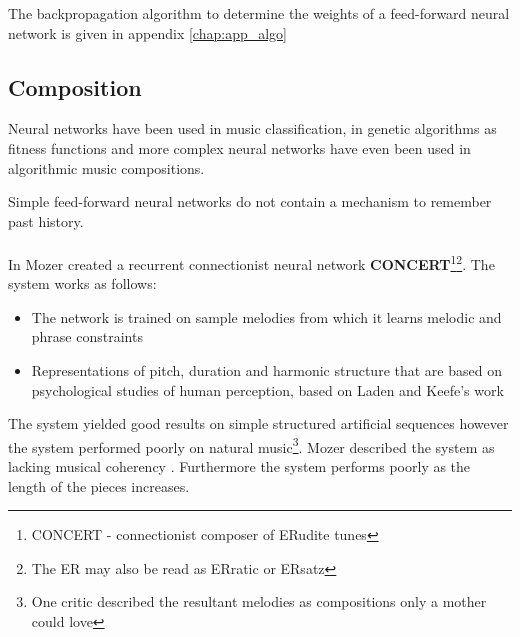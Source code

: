 The backpropagation algorithm to determine the weights of a feed-forward neural network is given in appendix \ref{chap:app_algo}


\subsection{Composition}
Neural networks have been used in music classification, in genetic algorithms as fitness functions and more complex neural networks have even been used in algorithmic music compositions.

Simple feed-forward neural networks do not contain a mechanism to remember past history.  
\\
\\
In \cite{mozer1994neural} Mozer created a recurrent connectionist neural network \textbf{CONCERT}\footnote{CONCERT - connectionist composer of ERudite tunes}\footnote{The ER may also be read as ERratic or ERsatz}.
The system works as follows:
\begin{itemize}
\item The network is trained on sample melodies from which it learns melodic and phrase constraints
\item Representations of pitch, duration and harmonic structure that are based on psychological studies of human perception, based on Laden and Keefe's work \cite{laden1989representation}
\end{itemize}
The system yielded good results on simple structured artificial sequences however the system performed poorly on natural music\footnote{One critic described the resultant melodies as compositions only a mother could love}. Mozer described the system as lacking musical coherency \cite{mozer1994neural}. Furthermore the system performs poorly as the length of the pieces increases.

